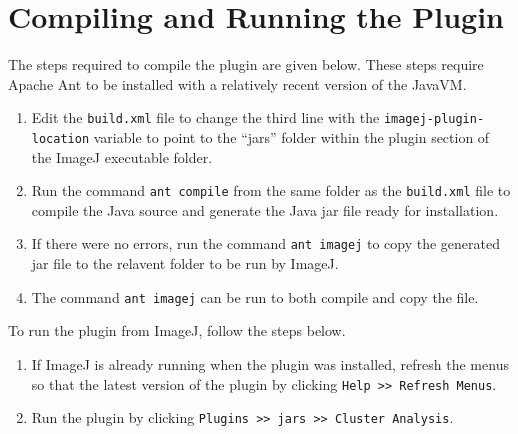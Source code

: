 
\section{Compiling and Running the Plugin}
\label{sec:running_the_plugin}

The steps required to compile the plugin are given below. These steps require
Apache Ant to be installed with a relatively recent version of the JavaVM\@.
\begin{enumerate}
	\item Edit the \texttt{build.xml} file to change the third line with the
		\texttt{imagej-plugin-location} variable to point to the ``jars''
		folder within the plugin section of the ImageJ executable folder.
	\item Run the command \texttt{ant compile} from the same folder as the
		\texttt{build.xml} file to compile the Java source and generate the
		Java jar file ready for installation.
	\item If there were no errors, run the command \texttt{ant imagej} to copy
		the generated jar file to the relavent folder to be run by ImageJ.
	\item The command \texttt{ant imagej} can be run to both compile and copy
		the file.
\end{enumerate}

To run the plugin from ImageJ, follow the steps below.
\begin{enumerate}
	\item If ImageJ is already running when the plugin was installed, refresh
		the menus so that the latest version of the plugin by clicking
		\texttt{Help >> Refresh Menus}.
	\item Run the plugin by clicking \texttt{Plugins >> jars >> Cluster
		Analysis}.
\end{enumerate}
